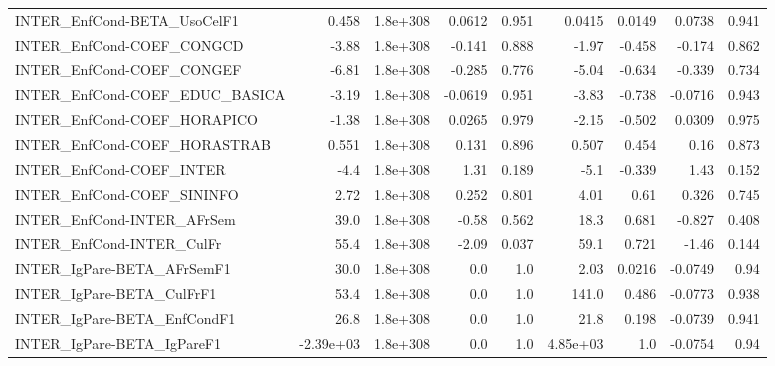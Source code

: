 \begin{tabular}{lrrrrrrrr}
INTER\_EnfCond-BETA\_UsoCelF1           &       0.458 &     1.8e+308 &  0.0612 &    0.951 &     0.0415 &      0.0149 &       0.0738 &         0.941 \\
INTER\_EnfCond-COEF\_CONGCD             &       -3.88 &     1.8e+308 &  -0.141 &    0.888 &      -1.97 &      -0.458 &       -0.174 &         0.862 \\
INTER\_EnfCond-COEF\_CONGEF             &       -6.81 &     1.8e+308 &  -0.285 &    0.776 &      -5.04 &      -0.634 &       -0.339 &         0.734 \\
INTER\_EnfCond-COEF\_EDUC\_BASICA        &       -3.19 &     1.8e+308 & -0.0619 &    0.951 &      -3.83 &      -0.738 &      -0.0716 &         0.943 \\
INTER\_EnfCond-COEF\_HORAPICO           &       -1.38 &     1.8e+308 &  0.0265 &    0.979 &      -2.15 &      -0.502 &       0.0309 &         0.975 \\
INTER\_EnfCond-COEF\_HORASTRAB          &       0.551 &     1.8e+308 &   0.131 &    0.896 &      0.507 &       0.454 &         0.16 &         0.873 \\
INTER\_EnfCond-COEF\_INTER              &        -4.4 &     1.8e+308 &    1.31 &    0.189 &       -5.1 &      -0.339 &         1.43 &         0.152 \\
INTER\_EnfCond-COEF\_SININFO            &        2.72 &     1.8e+308 &   0.252 &    0.801 &       4.01 &        0.61 &        0.326 &         0.745 \\
INTER\_EnfCond-INTER\_AFrSem            &        39.0 &     1.8e+308 &   -0.58 &    0.562 &       18.3 &       0.681 &       -0.827 &         0.408 \\
INTER\_EnfCond-INTER\_CulFr             &        55.4 &     1.8e+308 &   -2.09 &    0.037 &       59.1 &       0.721 &        -1.46 &         0.144 \\
INTER\_IgPare-BETA\_AFrSemF1            &        30.0 &     1.8e+308 &     0.0 &      1.0 &       2.03 &      0.0216 &      -0.0749 &          0.94 \\
INTER\_IgPare-BETA\_CulFrF1             &        53.4 &     1.8e+308 &     0.0 &      1.0 &      141.0 &       0.486 &      -0.0773 &         0.938 \\
INTER\_IgPare-BETA\_EnfCondF1           &        26.8 &     1.8e+308 &     0.0 &      1.0 &       21.8 &       0.198 &      -0.0739 &         0.941 \\
INTER\_IgPare-BETA\_IgPareF1            &   -2.39e+03 &     1.8e+308 &     0.0 &      1.0 &   4.85e+03 &         1.0 &      -0.0754 &          0.94 \\

\end{tabular}
